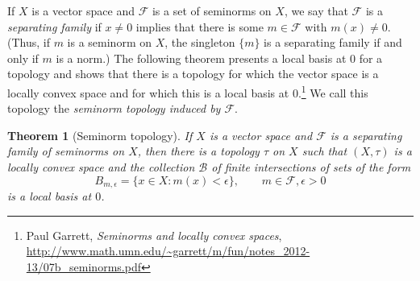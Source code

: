 \documentclass{article}
\newtheorem{theorem}{Theorem}
\begin{document}
If $X$ is a vector space and $\mathscr{F}$ is a set of seminorms on $X$, 
we say that $\mathscr{F}$ is a {\em separating family} if $x \neq 0$ implies that
there is some $m \in \mathscr{F}$ with $m(x) \neq 0$. (Thus, if $m$ is a seminorm on $X$, the singleton $\{m\}$ 
is a separating family if and only if $m$ is a norm.)  The following theorem presents a local basis at $0$ for a topology and shows that there is a topology
for which the vector space is a locally convex space and for which this is a local basis at $0$.\footnote{Paul Garrett, {\em Seminorms and locally convex spaces}, \url{http://www.math.umn.edu/~garrett/m/fun/notes_2012-13/07b_seminorms.pdf}} We call  this topology  the {\em seminorm topology induced by $\mathscr{F}$}.


\begin{theorem}[Seminorm topology]
If $X$ is a vector space and  $\mathscr{F}$ is a separating family of seminorms on $X$, then there is 
a topology $\tau$ on $X$ such that $(X,\tau)$ is a locally convex space and  the collection $\mathscr{B}$ of finite intersections of sets of the form
\[
B_{m,\epsilon}=\{x\in X: m(x)<\epsilon\}, \qquad m\in \mathscr{F}, \epsilon>0
\]
is a local basis at $0$.
\label{seminormtopology}
\end{theorem}
\end{document}
